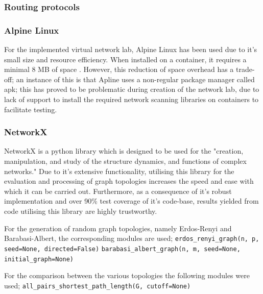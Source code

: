\subsubsection{Routing protocols}


\subsubsection{Alpine Linux}
For the implemented virtual network lab, Alpine Linux has been used due to it's small size and resource efficiency. When installed on a container, it  requires a minimal 8 MB of space \cite{alpine}. However, this reduction of space overhead has a trade-off; an instance of this is that Apline uses a non-regular package manager called apk; this has proved to be problematic during creation of the network lab, due to lack of support to install the required network scanning libraries on containers to facilitate testing. 

\subsubsection{NetworkX}
NetworkX is a python library which is designed to be used for the "creation, manipulation, and study of the structure dynamics, and functions of complex networks." \cite{networkX} Due to it's extensive functionality, utilising this library for the evaluation and processing of graph topologies increases the speed and ease with which it can be carried out. Furthermore, as a consequence of it's robust implementation and over 90\% test coverage of it's code-base, results yielded from code utilising this library are highly trustworthy. 

For the generation of random graph topologies, namely Erdos-Renyi and Barabasi-Albert, the corresponding modules are used; \newline
\verb|erdos_renyi_graph(n, p, seed=None, directed=False)| 
\verb|barabasi_albert_graph(n, m, seed=None, initial_graph=None)| 

For the comparison between the various topologies the following modules were used; \newline 
\verb|all_pairs_shortest_path_length(G, cutoff=None)|

